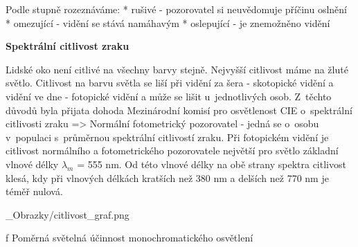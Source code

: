 \medskip
Podle stupně rozeznáváme:
\begitems
* rušivé - pozorovatel si neuvědomuje příčinu oslnění
* omezující - vidění se stává namáhavým
* oslepující - je znemožněno vidění
\enditems

\medskip\noindent
{\bf Spektrální citlivost zraku}

Lidské oko není citlivé na všechny barvy stejně. Nejvyšší citlivost máme na žluté světlo. Citlivost na barvu
světla se liší při vidění za šera - skotopické vidění a vidění ve dne - fotopické vidění a může se lišit
u~jednotlivých osob.
Z~těchto důvodů byla přijata dohoda Mezinárodní komisí pro osvětlenost CIE o~spektrální
citlivosti zraku => {\sbf Normální fotometrický pozorovatel} - jedná se o~osobu v~populaci s~průměrnou
spektrální citlivostí zraku. Při fotopickém vidění je citlivost normálního a fotometrického pozorovatele
největší pro světlo základní vlnové délky $λ_m$ = 555 nm. Od této vlnové délky na obě strany spektra
citlivost klesá, kdy při vlnových délkách kratších než 380 nm a delších než 770 nm je téměř nulová.

\medskip

\medskip {}
\picw=12cm _Obrazky/citlivost_graf.png
\caption/f Poměrná světelná účinnost monochromatického osvětlení


